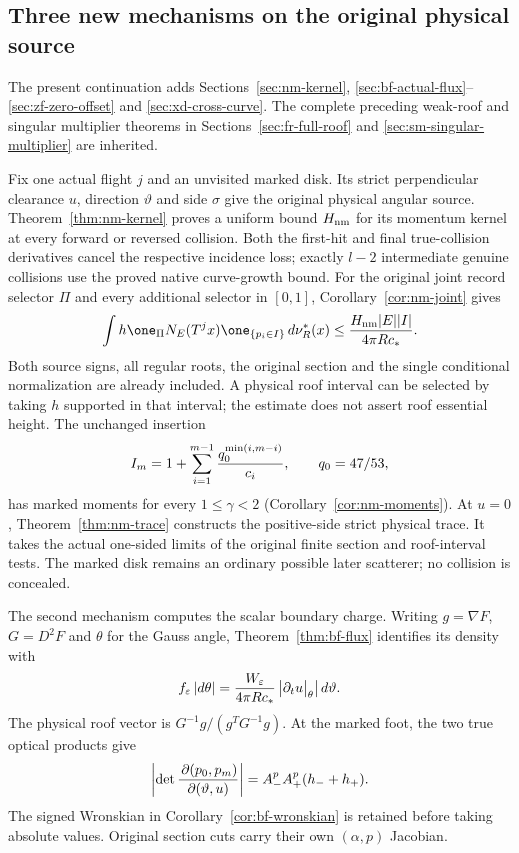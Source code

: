 \subsection*{Three new mechanisms on the original physical source}
The present continuation adds Sections~\ref{sec:nm-kernel},
\ref{sec:bf-actual-flux}--\ref{sec:zf-zero-offset} and
\ref{sec:xd-cross-curve}. The complete preceding weak-roof and singular
multiplier theorems in Sections~\ref{sec:fr-full-roof} and
\ref{sec:sm-singular-multiplier} are inherited.

Fix one actual flight $j$ and an unvisited marked disk.
Its strict perpendicular clearance $u$, direction $\vartheta$
and side $\sigma$ give the original physical angular source.
Theorem~\ref{thm:nm-kernel} proves a uniform bound $H_{\rm nm}$
for its momentum kernel at every forward or reversed collision.
Both the first-hit and final true-collision derivatives cancel the
respective incidence loss; exactly $l-2$ intermediate genuine collisions
use the proved native curve-growth bound. For the original joint
record selector $\Pi$ and every additional selector in $[0,1]$,
Corollary~\ref{cor:nm-joint} gives
\[
 \int h\one_\Pi N_E(T^j x)\one_{\{p_i\in I\}}\,d\nu_R^*(x)
       \le {H_{\rm nm}|E||I|\over4\pi R c_*}.
\]
Both source signs, all regular roots, the original section and the
single conditional normalization are already included.
A physical roof interval can be selected by taking $h$ supported
in that interval; the estimate does not assert roof essential height.
The unchanged insertion
\[
 I_m=1+\sum_{i=1}^{m-1}{q_0^{\min(i,m-i)}\over c_i},\qquad q_0=47/53,
\]
has marked moments for every $1\le\gamma<2$
(Corollary~\ref{cor:nm-moments}). At $u=0$,
Theorem~\ref{thm:nm-trace} constructs the positive-side strict physical
trace. It takes the actual one-sided limits of the original finite
section and roof-interval tests. The marked disk remains an ordinary
possible later scatterer; no collision is concealed.

The second mechanism computes the scalar boundary charge.
Writing $g=\nabla F$, $G=D^2F$ and $\theta$ for the Gauss angle,
Theorem~\ref{thm:bf-flux} identifies its density with
\[
 f_\varepsilon\,|d\theta|
 = {W_\varepsilon\over4\pi R c_*}
                  \left|\partial_t u\big|_\theta\right|d\vartheta .
\]
The physical roof vector is $G^{-1}g/(g^TG^{-1}g)$.
At the marked foot, the two true optical products give
\[
 \left|\det {\,\partial(p_0,p_m)\over\partial(\vartheta,u)}\right|
     = A_-^p A_+^p(h_-+h_+).
\]
The signed Wronskian in Corollary~\ref{cor:bf-wronskian} is retained
before taking absolute values. Original section cuts carry their
own $(\alpha,p)$ Jacobian.

